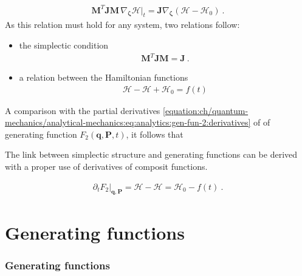 \documentclass[letterpaper,10pt,english]{jupyterBook}
\begin{document}
\begin{equation*}
\begin{split}
 \mathbf{M}^T \mathbf{J} \mathbf{M} \, \nabla_{\boldsymbol\zeta} \left.\mathcal{H}\right|_t
 = \mathbf{J} \nabla_{\boldsymbol\zeta} \left( \mathscr{H} - \mathscr{H}_0 \right) \ .
\end{split}
\end{equation*}
\sphinxAtStartPar
As this relation must hold for any system, two relations follow:
\begin{itemize}
\item {} 
\sphinxAtStartPar
the simplectic condition
\begin{equation*}
\begin{split}\mathbf{M}^T \mathbf{J} \mathbf{M} = \mathbf{J} \ .\end{split}
\end{equation*}
\item {} 
\sphinxAtStartPar
a relation between the Hamiltonian functions
\begin{equation*}
\begin{split}\mathcal{H} - \mathscr{H} + \mathscr{H}_0 = f(t)\end{split}
\end{equation*}
\end{itemize}

\sphinxAtStartPar
A comparison with the partial derivatives \eqref{equation:ch/quantum-mechanics/analytical-mechanics:eq:analytics:gen-fun-2:derivatives} of of  generating function \(F_2(\mathbf{q}, \mathbf{P}, t)\), it follows that%
\begin{footnote}[1]\sphinxAtStartFootnote
The link between simplectic structure and generating functions can be derived with a proper use of derivatives of composit functions.
%
\end{footnote}
\begin{equation*}
\begin{split}\left.\partial_t F_2\right|_{\mathbf{q}, \mathbf{P}} = \mathscr{H} - \mathcal{H} =\mathscr{H}_0 - f(t) \ .\end{split}
\end{equation*}

\section{Generating functions}
\label{\detokenize{ch/quantum-mechanics/analytical-mechanics:generating-functions}}\subsubsection*{Generating functions}
\end{document}
